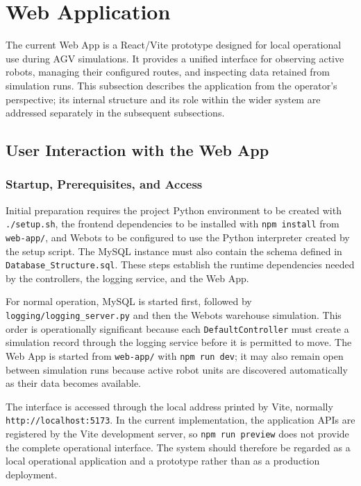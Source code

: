 \section{Web Application}
\label{sec:webapp}

The current Web App is a React/Vite prototype designed for local operational use during AGV simulations. It provides a unified interface for observing active robots, managing their configured routes, and inspecting data retained from simulation runs. This subsection describes the application from the operator's perspective; its internal structure and its role within the wider system are addressed separately in the subsequent subsections.

\subsection{User Interaction with the Web App}
\label{subsec:webapp-user-interaction}

\subsubsection{Startup, Prerequisites, and Access}

Initial preparation requires the project Python environment to be created with \texttt{./setup.sh}, the frontend dependencies to be installed with \texttt{npm install} from \texttt{web-app/}, and Webots to be configured to use the Python interpreter created by the setup script. The MySQL instance must also contain the schema defined in \texttt{Database\_Structure.sql}. These steps establish the runtime dependencies needed by the controllers, the logging service, and the Web App.

For normal operation, MySQL is started first, followed by \texttt{logging/logging\_server.py} and then the Webots warehouse simulation. This order is operationally significant because each \texttt{DefaultController} must create a simulation record through the logging service before it is permitted to move. The Web App is started from \texttt{web-app/} with \texttt{npm run dev}; it may also remain open between simulation runs because active robot units are discovered automatically as their data becomes available.

The interface is accessed through the local address printed by Vite, normally \texttt{http://localhost:5173}. In the current implementation, the application APIs are registered by the Vite development server, so \texttt{npm run preview} does not provide the complete operational interface. The system should therefore be regarded as a local operational application and a prototype rather than as a production deployment.

